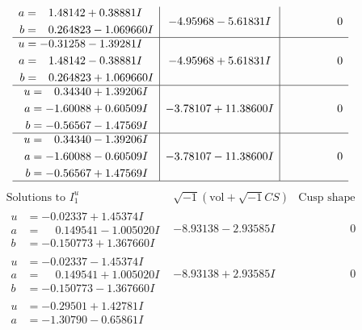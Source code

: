 \documentclass[1p]{elsarticle_modified}
\theoremstyle{definition}
\newcommand{\I}{\sqrt{-1}}
\begin{document}
$$\begin{array}{c|c|c}
\begin{aligned}
a &= \phantom{-}1.48142 + 0.38881 I \\
b &= \phantom{-}0.264823 - 1.069660 I\end{aligned}
 & -4.95968 - 5.61831 I & \phantom{-0.000000 } 0 \\ \hline\begin{aligned}
u &= -0.31258 - 1.39281 I \\
a &= \phantom{-}1.48142 - 0.38881 I \\
b &= \phantom{-}0.264823 + 1.069660 I\end{aligned}
 & -4.95968 + 5.61831 I & \phantom{-0.000000 } 0 \\ \hline\begin{aligned}
u &= \phantom{-}0.34340 + 1.39206 I \\
a &= -1.60088 + 0.60509 I \\
b &= -0.56567 - 1.47569 I\end{aligned}
 & -3.78107 + 11.38600 I & \phantom{-0.000000 } 0 \\ \hline\begin{aligned}
u &= \phantom{-}0.34340 - 1.39206 I \\
a &= -1.60088 - 0.60509 I \\
b &= -0.56567 + 1.47569 I\end{aligned}
 & -3.78107 - 11.38600 I & \phantom{-0.000000 } 0\\
 \hline 
 \end{array}$$\newpage$$\begin{array}{c|c|c}  
\text{Solutions to }I^u_{1}& \I (\text{vol} + \sqrt{-1}CS) & \text{Cusp shape}\\
 \hline 
\begin{aligned}
u &= -0.02337 + 1.45374 I \\
a &= \phantom{-}0.149541 - 1.005020 I \\
b &= -0.150773 + 1.367660 I\end{aligned}
 & -8.93138 - 2.93585 I & \phantom{-0.000000 } 0 \\ \hline\begin{aligned}
u &= -0.02337 - 1.45374 I \\
a &= \phantom{-}0.149541 + 1.005020 I \\
b &= -0.150773 - 1.367660 I\end{aligned}
 & -8.93138 + 2.93585 I & \phantom{-0.000000 } 0 \\ \hline\begin{aligned}
u &= -0.29501 + 1.42781 I \\
a &= -1.30790 - 0.65861 I \\

\end{aligned}
\end{array}$$
\end{document}
